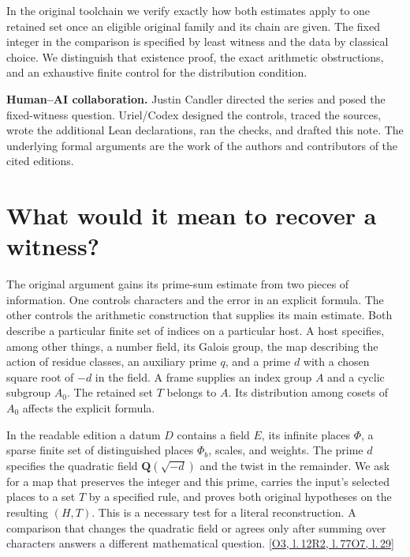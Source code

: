 \documentclass[12pt,letterpaper]{article}
\begin{document}
In the original toolchain we verify exactly how both estimates apply to one retained set once an eligible original family and its chain are given. The fixed integer in the comparison is specified by least witness and the data by classical choice. We distinguish that existence proof, the exact arithmetic obstructions, and an exhaustive finite control for the distribution condition.

\medskip\textbf{Human--AI collaboration.} Justin Candler directed the series and posed the fixed-witness question. Uriel/Codex designed the controls, traced the sources, wrote the additional Lean declarations, ran the checks, and drafted this note. The underlying formal arguments are the work of the authors and contributors of the cited editions.
\clearpage\begingroup\small\setlength{\parskip}{0pt}\tableofcontents\endgroup
\clearpage{}
\section{What would it mean to recover a witness?}
The original argument gains its prime-sum estimate from two pieces of information. One controls characters and the error in an explicit formula. The other controls the arithmetic construction that supplies its main estimate. Both describe a particular finite set of indices on a particular host. A host specifies, among other things, a number field, its Galois group, the map describing the action of residue classes, an auxiliary prime $q$, and a prime $d$ with a chosen square root of $-d$ in the field. A frame supplies an index group $A$ and a cyclic subgroup $A_0$. The retained set $T$ belongs to $A$. Its distribution among cosets of $A_0$ affects the explicit formula.

In the readable edition a datum $D$ contains a field $E$, its infinite places $\Phi$, a sparse finite set of distinguished places $\Phi_b$, scales, and weights. The prime $d$ specifies the quadratic field $\mathbf Q(\sqrt{-d})$ and the twist in the remainder. We ask for a map that preserves the integer and this prime, carries the input's selected places to a set $T$ by a specified rule, and proves both original hypotheses on the resulting $(H,T)$. This is a necessary test for a literal reconstruction. A comparison that changes the quadratic field or agrees only after summing over characters answers a different mathematical question.
 {\footnotesize\sffamily\color{mute}[\href{https://github.com/nousentllc/riemann-hypothesis/blob/40e56bab026552e089d7afcfeff08d2defb9c005/src/Formalism/SharpRestriction/RamificationFrobenius/TotientGaloisClasses/ConjEMemHostFIff.lean#L12}{O3, l.\,12}\enspace \href{https://github.com/leanprover-community/riemann-hypothesis/blob/e063a923620ee7787b4a1270421478645bf66bdb/src/New/Reduction/Data/AdmissibleData.lean#L77}{R2, l.\,77}\enspace \href{https://github.com/nousentllc/riemann-hypothesis/blob/40e56bab026552e089d7afcfeff08d2defb9c005/src/Development/AutomorphicArithmetic/PrimitiveCosets/CoreAtH.lean#L29}{O7, l.\,29}]}
 
\end{document}
